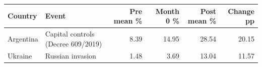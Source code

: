 \begin{tabular}{llrrrr}
\hline
Country & Event & Pre mean \% & Month 0 \% & Post mean \% & Change pp \\
\hline
Argentina & Capital controls (Decree 609/2019) & 8.39 & 14.95 & 28.54 & 20.15 \\
Ukraine & Russian invasion & 1.48 & 3.69 & 13.04 & 11.57 \\
\hline
\end{tabular}

